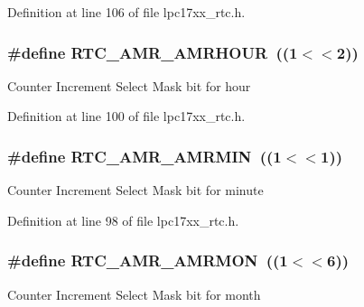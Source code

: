 \-Definition at line 106 of file lpc17xx\-\_\-rtc.\-h.

\hypertarget{group___r_t_c___private___macros_ga746bb71b5ec4edb87e6f1d57a669454d}{
\subsubsection[{\-R\-T\-C\-\_\-\-A\-M\-R\-\_\-\-A\-M\-R\-H\-O\-U\-R}]{\setlength{\rightskip}{0pt plus 5cm}\#define {\bf \-R\-T\-C\-\_\-\-A\-M\-R\-\_\-\-A\-M\-R\-H\-O\-U\-R}~((1$<$$<$2))}}\label{group___r_t_c___private___macros_ga746bb71b5ec4edb87e6f1d57a669454d}
\-Counter \-Increment \-Select \-Mask bit for hour 

\-Definition at line 100 of file lpc17xx\-\_\-rtc.\-h.

\hypertarget{group___r_t_c___private___macros_ga39856f420fe75303c84236d5f8ae35ff}{
\subsubsection[{\-R\-T\-C\-\_\-\-A\-M\-R\-\_\-\-A\-M\-R\-M\-I\-N}]{\setlength{\rightskip}{0pt plus 5cm}\#define {\bf \-R\-T\-C\-\_\-\-A\-M\-R\-\_\-\-A\-M\-R\-M\-I\-N}~((1$<$$<$1))}}\label{group___r_t_c___private___macros_ga39856f420fe75303c84236d5f8ae35ff}
\-Counter \-Increment \-Select \-Mask bit for minute 

\-Definition at line 98 of file lpc17xx\-\_\-rtc.\-h.

\hypertarget{group___r_t_c___private___macros_ga326738340b62ab2cd823ce290c2e5b3e}{
\subsubsection[{\-R\-T\-C\-\_\-\-A\-M\-R\-\_\-\-A\-M\-R\-M\-O\-N}]{\setlength{\rightskip}{0pt plus 5cm}\#define {\bf \-R\-T\-C\-\_\-\-A\-M\-R\-\_\-\-A\-M\-R\-M\-O\-N}~((1$<$$<$6))}}\label{group___r_t_c___private___macros_ga326738340b62ab2cd823ce290c2e5b3e}
\-Counter \-Increment \-Select \-Mask bit for month 

